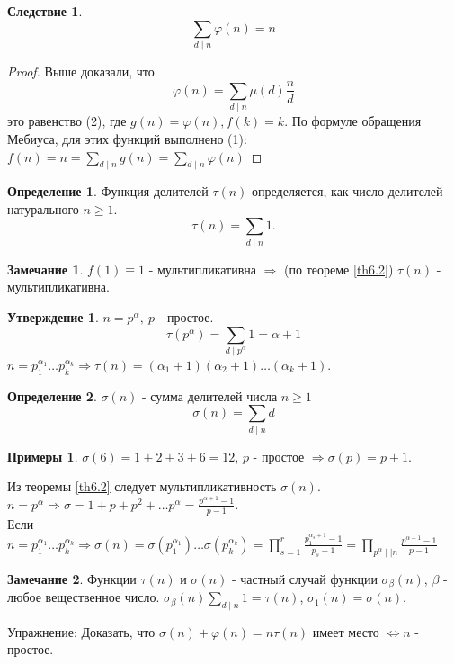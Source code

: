 \documentclass[a4paper, 12pt]{article}
\renewcommand{\phi}{\varphi}
\newcommand{\lra}{\Leftrightarrow}
\renewcommand{\div}{\mid}
\theoremstyle{definition}
\newtheorem{definition}{Определение}[section]
\newtheorem*{consequense}{Следствие}
\newtheorem{statement}{Утверждение}[section]
\newtheorem*{comm}{Замечание}
\newtheorem*{examples}{Примеры}
\begin{document}
    \begin{consequense}
        \[\sum\limits_{d\div n}\phi(n)=n\]
    \end{consequense}
    \begin{proof}
        Выше доказали, что
        \[\phi(n)=\sum\limits_{d\div n}\mu(d)\frac{n}{d}\]
        это равенство (2), где $g(n)=\phi(n), f(k)=k$. По формуле обращения Мебиуса, для этих функций выполнено (1): $f(n)=n=\sum\limits_{d\div n}g(n)=\sum\limits_{d\div n}\phi(n)$ 
    \end{proof} 
    \begin{definition}
        Функция делителей $\tau(n)$ определяется, как число делителей натурального $n\geq 1$.
        \[\tau(n)=\sum\limits_{d\div n}1.\]
    \end{definition}
    \begin{comm}
        $f(1)\equiv 1$ - мультипликативна $\Rightarrow$ (по теореме \ref{th6.2}) $\tau(n)$ - мультипликативна.
    \end{comm} 
    \begin{statement}
        $n=p^{\alpha}, \ p$ - простое.
        \[\tau(p^{\alpha})=\sum\limits_{d\div p^{\alpha}}1=\alpha+1\]
        $n=p_1^{\alpha_1}\dots p_k^{\alpha_k}\Rightarrow \tau(n)=(\alpha_1+1)(\alpha_2+1)\dots(\alpha_k+1)$.
    \end{statement}
    \begin{definition}
        $\sigma(n)$ - сумма делителей числа $n\geq 1$
        \[\sigma(n)=\sum\limits_{d\div n}d\]
    \end{definition} 
    \begin{examples}
        $\sigma(6)=1+2+3+6=12$, $p$ - простое $\Rightarrow \sigma(p)=p+1$.
    \end{examples}
    Из теоремы \ref{th6.2} следует мультипликативность $\sigma(n)$.\\
    $n=p^{\alpha} \Rightarrow \sigma = 1+p+p^2+\dots p^{\alpha}=\frac{p^{\alpha+1}-1}{p-1}$.\\
    Если $n=p_1^{\alpha_1}\dots p_k^{\alpha_k} \Rightarrow \sigma(n)=\sigma(p_1^{\alpha_1})\dots \sigma(p_k^{\alpha_k})=\prod\limits_{s=1}^r\frac{p_1^{\alpha_s+1}-1}{p_s-1}=\prod\limits_{p^{\alpha} \div\div n}\frac{p^{\alpha+1}-1}{p-1}$
    \begin{comm}
        Функции $\tau(n)$ и $\sigma(n)$ - частный случай функции $\sigma_{\beta}(n)$, $\beta$ - любое вещественное число.
        $\sigma_{\beta}(n)\sum\limits_{d\div n}1=\tau(n)$, $\sigma_1(n)=\sigma(n)$.
    \end{comm}
    Упражнение: Доказать, что $\sigma(n)+\phi(n)=n\tau(n)$ имеет место $\lra n$ - простое.
\end{document}
